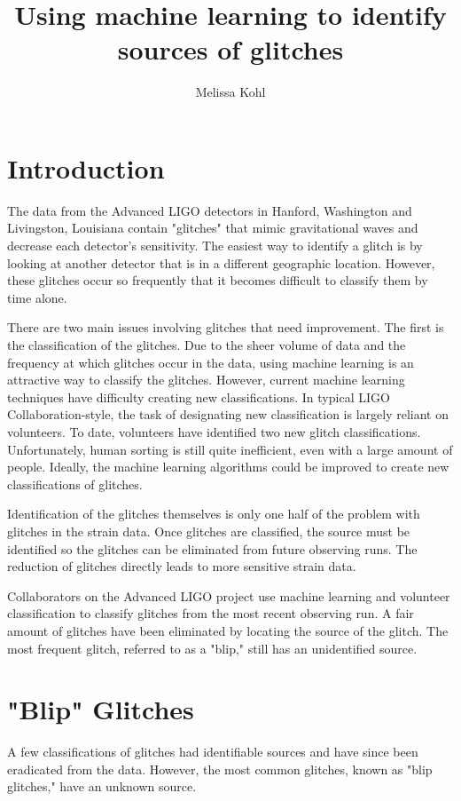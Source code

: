 \documentclass[a4paper]{article}
\title{Using machine learning to identify sources of glitches}
\author{Melissa Kohl}
\begin{document}
\maketitle

\section{Introduction}

The data from the Advanced LIGO detectors in Hanford, Washington and Livingston, Louisiana contain "glitches" that mimic gravitational waves and decrease each detector's sensitivity. The easiest way to identify a glitch is by looking at another detector that is in a different geographic location. However, these glitches occur so frequently that it becomes difficult to classify them by time alone. 

There are two main issues involving glitches that need improvement. The first is the classification of the glitches. Due to the sheer volume of data and the frequency at which glitches occur in the data, using machine learning is an attractive way to classify the glitches. However, current machine learning techniques have difficulty creating new classifications. In typical LIGO Collaboration-style, the task of designating new classification is largely reliant on volunteers. To date, volunteers have identified two new glitch classifications. Unfortunately, human sorting is still quite inefficient, even with a large amount of people. Ideally, the machine learning algorithms could be improved to create new classifications of glitches. 

Identification of the glitches themselves is only one half of the problem with glitches in the strain data. Once glitches are classified, the source must be identified so the glitches can be eliminated from future observing runs. The reduction of glitches directly leads to more sensitive strain data.

Collaborators on the Advanced LIGO project use machine learning and volunteer classification to classify glitches from the most recent observing run. A fair amount of glitches have been eliminated by locating the source of the glitch. The most frequent glitch, referred to as a "blip," still has an unidentified source.

\section{"Blip" Glitches}

A few classifications of glitches had identifiable sources and have since been eradicated from the data. However, the most common glitches, known as "blip glitches," have an unknown source.
\end{document}
